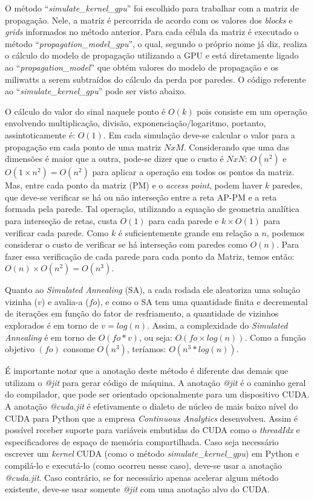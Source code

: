 \documentclass[
	12pt,				%
	twoside,			%
	a4paper,			%
	english,			%
	french,				%
	spanish,			%
	brazil				%
	]{abntex2}
\begin{document}
O método ``\emph{simulate\_kernel\_gpu}'' foi escolhido para trabalhar
com a matriz de propagação. Nele, a matriz é percorrida de acordo com os
valores dos \emph{blocks} e \emph{grids} informados no método anterior.
Para cada célula da matriz é executado o método
``\emph{propagation\_model\_gpu}'', o qual, segundo o próprio nome já
diz, realiza o cálculo do modelo de propagação utilizando a GPU e está
diretamente ligado ao ``\emph{propagation\_model}'' que obtém valores do
modelo de propagação e os miliwatts a serem subtraídos do cálculo da
perda por paredes. O código referente ao
``\emph{simulate\_kernel\_gpu}'' pode ser visto abaixo.



O cálculo do valor do sinal naquele ponto é \(O(k)\) pois consiste em um
operação envolvendo multiplicação, divisão, exponenciação/logaritmo,
portanto, assintoticamente é: \(O(1)\). Em cada simulação deve-se
calcular o valor para a propagação em cada ponto de uma matriz \(NxM\).
Considerando que uma das dimensões é maior que a outra, pode-se dizer
que o custo é \(NxN\): \(O(n^{2})\) e \(O(1\times n^{2}) = O(n^{2})\)
para aplicar a operação em todos os pontos da matriz. Mas, entre cada
ponto da matriz (PM) e o \emph{access point}, podem haver \(k\) paredes,
que deve-se verificar se há ou não interseção entre a reta AP-PM e a
reta formada pela parede. Tal operação, utilizando a equação de
geometria analítica para interseção de retas, custa \(O(1)\) para cada
parede e \(k\times O(1)\) para verificar cada parede. Como \(k\) é
suficientemente grande em relação a \(n\), podemos considerar o custo de
verificar se há interseção com paredes como \(O(n)\). Para fazer essa
verificação de cada parede para cada ponto da Matriz, temos então:
\(O(n)\times O(n^{2}) = O(n^{3})\).

Quanto ao \emph{Simulated Annealing} (SA), a cada rodada ele aleatoriza
uma solução vizinha (\(v\)) e avalia-a (\(fo\)), e como o SA tem uma
quantidade finita e decremental de iterações em função do fator de
resfriamento, a quantidade de vizinhos explorados é em torno de
\(v = log(n)\). Assim, a complexidade do \emph{Simulated Annealing} é em
torno de \(O(fo*v)\), ou seja: \(O(fo \times log (n))\). Como a função
objetivo \((fo)\) consome \(O(n^{3})\), teríamos:
\(O(n^{3} * log (n))\).

É importante notar que a anotação deste método é diferente das demais
que utilizam o \emph{@jit} para gerar código de máquina. A anotação
\emph{@jit} é o caminho geral do compilador, que pode ser orientado
opcionalmente para um dispositivo CUDA. A anotação \emph{@cuda.jit} é
efetivamente o dialeto de núcleo de mais baixo nível do CUDA para Python
que a empresa \emph{Continuous Analytics} desenvolveu. Assim é possível
receber suporte para variáveis embutidas do CUDA como o \emph{threadIdx}
e especificadores de espaço de memória compartilhada. Caso seja
necessário escrever um \emph{kernel} CUDA (como o método
\emph{simulate\_kernel\_gpu}) em Python e compilá-lo e executá-lo (como
ocorreu nesse caso), deve-se usar a anotação \emph{@cuda.jit}. Caso
contrário, se for necessário apenas acelerar algum método existente,
deve-se usar somente \emph{@jit} com uma anotação alvo do CUDA.
\end{document}
